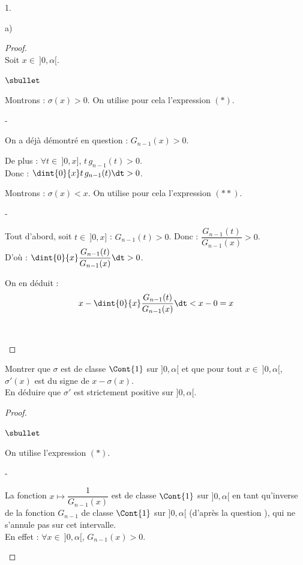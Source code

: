 \documentclass[11pt]{article}%
\begin{document}
\begin{noliste}{1.}
\begin{noliste}{a)}
    \begin{proof}~\\
      Soit $x \in \ ]0,\alpha[$.
      \begin{noliste}{$\sbullet$}
	\item Montrons : $\sigma(x) >0$. On utilise pour cela 
	l'expression $(*)$.
	\begin{noliste}{-}
	  \item On a déjà démontré en question  : 
	  $G_{n-1}(x) >0$.
	  
	  \item De plus : $\forall t \in \ ]0,x]$, $t \, g_{n-1}(t)
	  >0$.\\[.1cm]
	  Donc : $\dint{0}{x} t \, g_{n-1}(t) \dt >0$.
	\end{noliste}
	
	\item Montrons : $\sigma(x) < x$. On utilise pour cela 
	l'expression $(**)$.
	\begin{noliste}{-}
	  \item Tout d'abord, soit $t \in \ ]0,x]$ : 
	  $G_{n-1}(t) >0$. Donc : $\dfrac{G_{n-1}(t)}{G_{n-1}(x)}
	  >0$.\\[.1cm]
	  D'où : $\dint{0}{x} \dfrac{G_{n-1}(t)}{G_{n-1}(x)} \dt >0$.
	  
	  \item On en déduit :
	  \[
	    x - \dint{0}{x} \dfrac{G_{n-1}(t)}{G_{n-1}(x)} \dt
	    < x-0 = x
	  \]
	\end{noliste}
	~\\[-1.6cm]
      \end{noliste}
    \end{proof}

    
    \item Montrer que $\sigma$ est de classe $\Cont{1}$ sur $]0,\alpha[$
    et que pour tout $x \in \ ]0,\alpha[$, $\sigma'(x)$ est du signe 
    de $x- \sigma(x)$.\\
    En déduire que $\sigma'$ est strictement positive sur $]0,\alpha[$.
    
    \begin{proof}~
      \begin{noliste}{$\sbullet$}
	\item On utilise l'expression $(*)$.
	\begin{noliste}{-}
	  \item La fonction $x \mapsto \dfrac{1}{G_{n-1}(x)}$ est de 
	  classe $\Cont{1}$ sur $]0, \alpha[$ en tant qu'inverse de 
	  la fonction $G_{n-1}$ de classe $\Cont{1}$ sur $]0,\alpha[$
	  (d'après la question ), qui ne s'annule pas 
	  sur cet intervalle.\\
	  En effet : $\forall x \in \ ]0,\alpha[$, $G_{n-1}(x)>0$.
	  

\end{noliste}
\end{noliste}
\end{proof}
\end{noliste}
\end{noliste}
\end{document}
